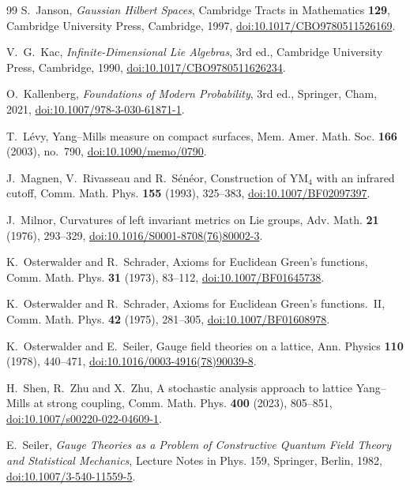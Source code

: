 \documentclass[11pt]{amsart}
\theoremstyle{definition}
\theoremstyle{remark}
\numberwithin{equation}{section}
\begin{document}
\begin{thebibliography}{99}
S.~Janson, \emph{Gaussian Hilbert Spaces}, Cambridge Tracts in Mathematics
\textbf{129}, Cambridge University Press, Cambridge, 1997,
\href{https://doi.org/10.1017/CBO9780511526169}{doi:10.1017/CBO9780511526169}.

V.~G.~Kac, \emph{Infinite-Dimensional Lie Algebras}, 3rd ed., Cambridge University Press, Cambridge, 1990, \href{https://doi.org/10.1017/CBO9780511626234}{doi:10.1017/CBO9780511626234}.

O.~Kallenberg, \emph{Foundations of Modern Probability}, 3rd ed., Springer,
Cham, 2021, \href{https://doi.org/10.1007/978-3-030-61871-1}
{doi:10.1007/978-3-030-61871-1}.

T.~L\'evy, Yang--Mills measure on compact surfaces, Mem. Amer. Math. Soc. \textbf{166} (2003), no.~790, \href{https://doi.org/10.1090/memo/0790}{doi:10.1090/memo/0790}.

J.~Magnen, V.~Rivasseau and R.~S\'en\'eor, Construction of YM$_4$ with an infrared cutoff, Comm. Math. Phys. \textbf{155} (1993), 325--383, \href{https://doi.org/10.1007/BF02097397}{doi:10.1007/BF02097397}.

J.~Milnor, Curvatures of left invariant metrics on Lie groups, Adv.
Math. \textbf{21} (1976), 293--329,
\href{https://doi.org/10.1016/S0001-8708(76)80002-3}{doi:10.1016/S0001-8708(76)80002-3}.

K.~Osterwalder and R.~Schrader, Axioms for Euclidean Green's functions,
Comm. Math. Phys. \textbf{31} (1973), 83--112,
\href{https://doi.org/10.1007/BF01645738}{doi:10.1007/BF01645738}.

K.~Osterwalder and R.~Schrader, Axioms for Euclidean Green's functions.~II,
Comm. Math. Phys. \textbf{42} (1975), 281--305,
\href{https://doi.org/10.1007/BF01608978}{doi:10.1007/BF01608978}.

K.~Osterwalder and E.~Seiler, Gauge field theories on a lattice, Ann. Physics
\textbf{110} (1978), 440--471,
\href{https://doi.org/10.1016/0003-4916(78)90039-8}{doi:10.1016/0003-4916(78)90039-8}.

H.~Shen, R.~Zhu and X.~Zhu, A stochastic analysis approach to lattice
Yang--Mills at strong coupling, Comm. Math. Phys. \textbf{400} (2023),
805--851, \href{https://doi.org/10.1007/s00220-022-04609-1}{doi:10.1007/s00220-022-04609-1}.

E.~Seiler, \emph{Gauge Theories as a Problem of Constructive Quantum Field
Theory and Statistical Mechanics}, Lecture Notes in Phys. 159, Springer,
Berlin, 1982, \href{https://doi.org/10.1007/3-540-11559-5}{doi:10.1007/3-540-11559-5}.


\end{thebibliography}
\end{document}
